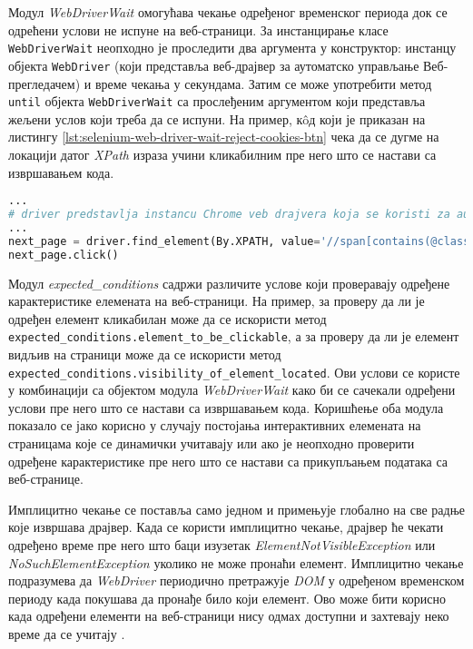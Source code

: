 \documentclass[12pt,oneside]{memoir}
\begin{document}
Модул \textit{WebDriverWait} омогућава чекање одређеног временског периода док се одрећени услови не испуне на веб-страници. За инстанцирање класе \texttt{WebDriverWait} неопходно је проследити два аргумента у конструктор: инстанцу објекта \texttt{WebDriver} (који представља веб-драјвер за аутоматско управљање Веб-прегледачем) и време чекања у секундама.
Затим се може употребити метод \texttt{until} објекта \texttt{WebDriverWait} са прослеђеним аргументом који представља жељени услов који треба да се испуни. На пример, кôд који је приказан на листингу \ref{lst:selenium-web-driver-wait-reject-cookies-btn} чека да се дугме на локацији датог \textit{XPath} израза учини кликабилним пре него што се настави са извршавањем кода. 
\begin{lstlisting}[language=Python, caption={Симулација клика на елемент}, label={lst:selenium-web-driver-wait-reject-cookies-btn}]
...
# driver predstavlja instancu Chrome veb drajvera koja se koristi za automatizaciju pregledaca
...
next_page = driver.find_element(By.XPATH, value='//span[contains(@class, "nextButton")]')
next_page.click()
\end{lstlisting}

Модул \textit{expected\_conditions} садржи различите услове који проверавају одређене карактеристике елемената на веб-страници. На пример, за проверу да ли је одређен елемент кликабилан може да се искористи метод \texttt{expected\_conditions.element\_to\_be\_clickable}, а за проверу да ли је елемент видљив на страници може да се искористи метод \texttt{expected\_conditions.visibility\_of\_element\_located}.
Ови услови се користе у комбинацији са објектом модула \textit{WebDriverWait} како би се сачекали одређени услови пре него што се настави са извршавањем кода.
Коришћење оба модула показало се јако корисно у случају постојања интерактивних елемената на страницама које се динамички учитавају или ако је неопходно проверити одређене карактеристике пре него што се настави са прикупљањем података са веб-странице.

Имплицитно чекање се поставља само једном и примењује глобално на све радње које извршава драјвер. Када се користи имплицитно чекање, драјвер ће чекати одређено време пре него што баци изузетак \textit{ElementNotVisibleException} или \textit{NoSuchElementException} уколико не може пронаћи елемент. Имплицитно чекање подразумева да \textit{WebDriver} периодично претражује \textit{DOM} у одређеном временском периоду када покушава да пронађе било који елемент. Ово може бити корисно када одређени елементи на веб-страници нису одмах доступни и захтевају неко време да се учитају \cite{selenium}.
\end{document}
